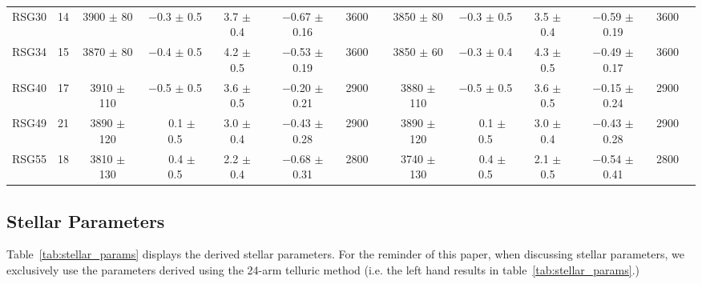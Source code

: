 \documentclass[manuscript]{aastex}
\def\pp{$\phantom{-}$}
\def\o{$\phantom{0}$}
\begin{document}
\begin{table*}
\begin{center}
\begin{tabular}{lcccccc c cccccc}
RSG30 & 14& 3900 $\pm$ 80\o & $-$0.3 $\pm$ 0.5 & 3.7 $\pm$ 0.4 & $-$0.67 $\pm$ 0.16 & 3600 & & 3850 $\pm$ 80\o & $-$0.3 $\pm$ 0.5 &  3.5 $\pm$ 0.4 & $-$0.59 $\pm$ 0.19 & 3600 \\
RSG34 & 15& 3870 $\pm$ 80\o & $-$0.4 $\pm$ 0.5 & 4.2 $\pm$ 0.5 & $-$0.53 $\pm$ 0.19 & 3600 & & 3850 $\pm$ 60\o & $-$0.3 $\pm$ 0.4 &  4.3 $\pm$ 0.5 & $-$0.49 $\pm$ 0.17 & 3600 \\
RSG40 & 17& 3910 $\pm$ 110  & $-$0.5 $\pm$ 0.5 & 3.6 $\pm$ 0.5 & $-$0.20 $\pm$ 0.21 & 2900 & & 3880 $\pm$ 110  & $-$0.5 $\pm$ 0.5 &  3.6 $\pm$ 0.5 & $-$0.15 $\pm$ 0.24 & 2900 \\
RSG49 & 21& 3890 $\pm$ 120  & \pp0.1 $\pm$ 0.5 & 3.0 $\pm$ 0.4 & $-$0.43 $\pm$ 0.28 & 2900 & & 3890 $\pm$ 120  & \pp0.1 $\pm$ 0.5 &  3.0 $\pm$ 0.4 & $-$0.43 $\pm$ 0.28 & 2900 \\
RSG55 & 18& 3810 $\pm$ 130  & \pp0.4 $\pm$ 0.5 & 2.2 $\pm$ 0.4 & $-$0.68 $\pm$ 0.31 & 2800 & & 3740 $\pm$ 130  & \pp0.4 $\pm$ 0.5 &  2.1 $\pm$ 0.5 & $-$0.54 $\pm$ 0.41 & 2800 \\

  \hline
  \end{tabular}
  \end{center}
\end{table*}

\subsection{Stellar Parameters} %
\label{sub:stellar_parameters}

Table~\ref{tab:stellar_params} displays the derived stellar parameters.
For the reminder of this paper, when discussing stellar parameters,
we exclusively use the parameters derived using the 24-arm telluric method (i.e. the left hand results in table~\ref{tab:stellar_params}.)
\end{document}
